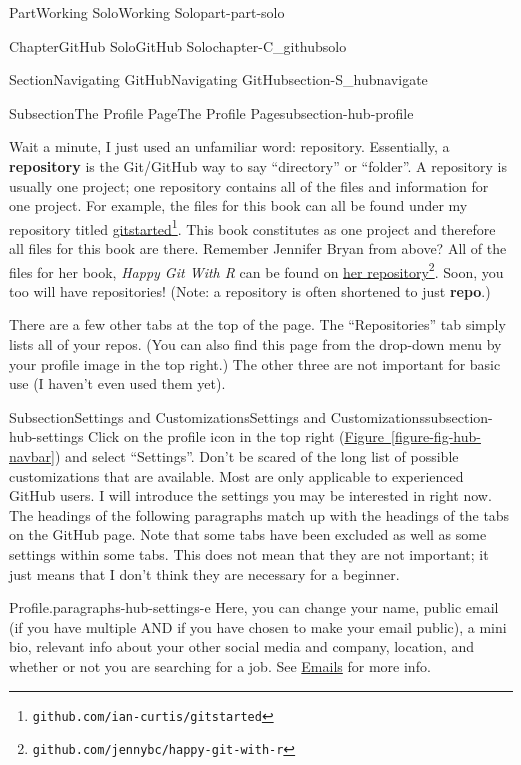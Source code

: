 \documentclass[oneside,10pt,]{book}
\newcommand{\xreffont}{\relax}
\newcommand{\terminology}[1]{\textbf{#1}}
\newcommand{\pubtitle}[1]{\textsl{#1}}
\begin{document}
\begin{partptx}{Part}{Working Solo}{}{Working Solo}{}{}{part-part-solo}
\begin{chapterptx}{Chapter}{GitHub Solo}{}{GitHub Solo}{}{}{chapter-C_githubsolo}
\begin{sectionptx}{Section}{Navigating GitHub}{}{Navigating GitHub}{}{}{section-S_hubnavigate}
\begin{subsectionptx}{Subsection}{The Profile Page}{}{The Profile Page}{}{}{subsection-hub-profile}
\par
Wait a minute, I just used an unfamiliar word: repository. Essentially, a \terminology{repository} is the Git\slash{}GitHub way to say ``directory'' or ``folder''. A repository is usually one project; one repository contains all of the files and information for one project. For example, the files for this book can all be found under my repository titled \href{https://github.com/ian-curtis/gitstarted}{gitstarted}\footnote{\nolinkurl{github.com/ian-curtis/gitstarted}\label{fn-hub-profile-l-e}}. This book constitutes as one project and therefore all files for this book are there. Remember Jennifer Bryan from above? All of the files for her book, \pubtitle{Happy Git With R} can be found on \href{https://github.com/jennybc/happy-git-with-r}{her repository}\footnote{\nolinkurl{github.com/jennybc/happy-git-with-r}\label{fn-hub-profile-l-h}}. Soon, you too will have repositories! (Note: a repository is often shortened to just \terminology{repo}.)%
\par
There are a few other tabs at the top of the page. The ``Repositories'' tab simply lists all of your repos. (You can also find this page from the drop-down menu by your profile image in the top right.) The other three are not important for basic use (I haven't even used them yet).%
\end{subsectionptx}
%
%
\typeout{************************************************}
\typeout{************************************************}
%
\begin{subsectionptx}{Subsection}{Settings and Customizations}{}{Settings and Customizations}{}{}{subsection-hub-settings}
%
%
Click on the profile icon in the top right (\hyperref[figure-fig-hub-navbar]{Figure~{\xreffont\ref{figure-fig-hub-navbar}}}) and select ``Settings''. Don't be scared of the long list of possible customizations that are available. Most are only applicable to experienced GitHub users. I will introduce the settings you may be interested in right now. The headings of the following paragraphs match up with the headings of the tabs on the GitHub page. Note that some tabs have been excluded as well as some settings within some tabs. This does not mean that they are not important; it just means that I don't think they are necessary for a beginner.%
\begin{paragraphs}{Profile.}{paragraphs-hub-settings-e}%
%
Here, you can change your name, public email (if you have multiple AND if you have chosen to make your email public), a mini bio, relevant info about your other social media and company, location, and whether or not you are searching for a job. See \hyperlink{paragraphs-hub-emails}{Emails} for more info.%

\end{paragraphs}
\end{subsectionptx}
\end{sectionptx}
\end{chapterptx}
\end{partptx}
\end{document}
